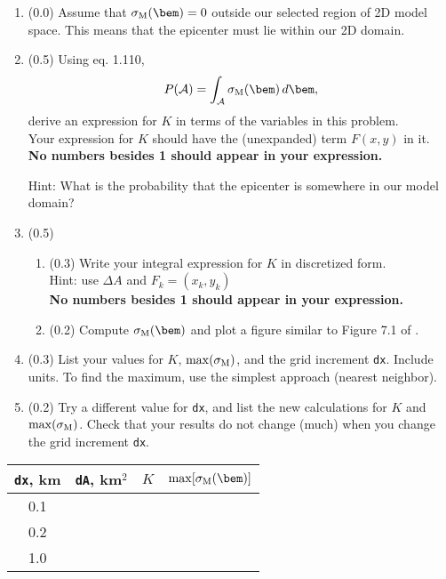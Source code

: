 \documentclass[11pt,titlepage,fleqn]{article}
\begin{document}
\begin{enumerate}
\item (0.0) Assume that $\sigma_{\rm M}(\bem) = 0$ outside our selected region of 2D model space. This means that the epicenter must lie within our 2D domain.

\item (0.5) Using eq. 1.110,
%
\begin{equation}
P({\cal A}) = \int_{\cal A} \sigma_{\rm M}(\bem) \, d\bem,
\end{equation}
%
derive an expression for $K$ in terms of the variables in this problem. \\
Your expression for $K$ should have the (unexpanded) term $F(x,y)$ in it. \\
{\bf No numbers besides 1 should appear in your expression.}

Hint: What is the probability that the epicenter is somewhere in our model domain?

\item (0.5) 

\begin{enumerate}
\item (0.3) Write your integral expression for $K$ in discretized form. \\
Hint: use $\Delta A$ and $F_k = (x_k,y_k)$ \\
{\bf No numbers besides 1 should appear in your expression.}
\item (0.2) Compute $\sigma_{\rm M}(\bem)$ and plot a figure similar to Figure 7.1 of \citet{Tarantola2005}.
\end{enumerate}

\item (0.3) List your values for $K$, $\max(\sigma_{\rm M})$, and the grid increment \verb+dx+. Include units. To find the maximum, use the simplest approach (nearest neighbor).

\item (0.2) Try a different value for \verb+dx+, and list the new calculations for $K$ and $\max(\sigma_{\rm M})$.  Check that your results do not change (much) when you change the grid increment \verb+dx+.

\label{sigma1}

\end{enumerate}

\begin{spacing}{2.0}
\centering
\begin{tabular}{c|c|c|c}
\hline\hline
\verb+dx+, km & \verb+dA+, km$^2$ & $K$ & $\max[\sigma_{\rm M}(\bem)]$ \\ \hline\hline
0.1 & \hspace{0.5cm} & \hspace{3cm} & \hspace{4cm}  \\ \hline
0.2 & & &  \\ \hline
1.0 & & &  \\ \hline
\end{tabular}
\end{spacing}
\end{document}
